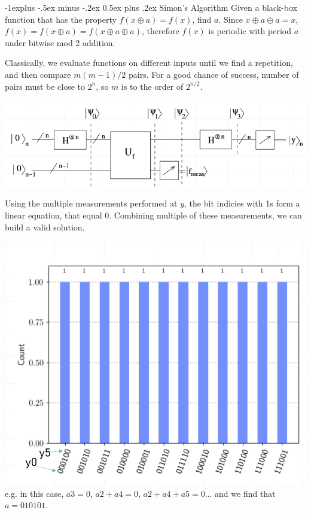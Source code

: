\documentclass[letterpaper, 8pt]{extarticle}
\makeatletter
\renewcommand{\subsection}{\@startsection{subsection}{2}{0mm}%
                                {-1explus -.5ex minus -.2ex}%
                                {0.5ex plus .2ex}%
                                {\normalfont\small\bfseries}}
\makeatother
\begin{document}
\begin{multicols*}{5}
    \subsection{Simon's Algorithm}
    Given a black-box function that has the property $f(x \oplus a) = f(x)$, find $a$.
    Since $x \oplus a \oplus a = x$, $f(x) = f(x \oplus a) = f(x \oplus a \oplus a)$,
    therefore $f(x)$ is periodic with period $a$ under bitwise mod 2 addition.

    Classically, we evaluate functions on different inputs until we find a repetition,
    and then compare $m(m-1)/2$ pairs.
    For a good chance of success, number of pairs must be close to $2^n$,
    so $m$ is to the order of $2^{n/2}$.

    \includegraphics[width=\linewidth]{Simon's Algo.png}

    Using the multiple measurements performed at $y$, the bit indicies with 1s form a linear equation,
    that equal 0. Combining multiple of these measurements, we can build a valid solution.

    \includegraphics[width=\linewidth]{Simon's Algo Results.png}
    e.g. in this case,
    $a3 = 0$, $a2 + a4 = 0$, $a2 + a4 + a5 = 0$... and we find that $a = 010101$.


\end{multicols*}
\end{document}
